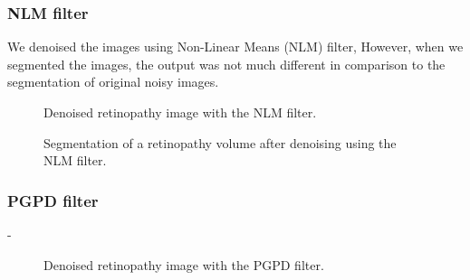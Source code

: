 \subsubsection{NLM filter}
 We denoised the images using Non-Linear Means (NLM) filter, However, when we segmented the images, the output was not much different in comparison to the segmentation of original noisy images. 
\begin{figure}[H]
  \centering
  \caption{Denoised retinopathy image with the NLM filter.} 
  \label{fig:results_rimage_nlm}
\end{figure}

\begin{figure}[H]
  \centering
  \caption{Segmentation of a retinopathy volume after denoising using the NLM filter.} 
  \label{fig:results_rsegmentation_nlm}
\end{figure}


\subsubsection{PGPD filter}
-
\begin{figure}[H]
  \centering
  \caption{Denoised retinopathy image with the PGPD filter.} 
  \label{fig:results_rimage_pgpd}
\end{figure}

